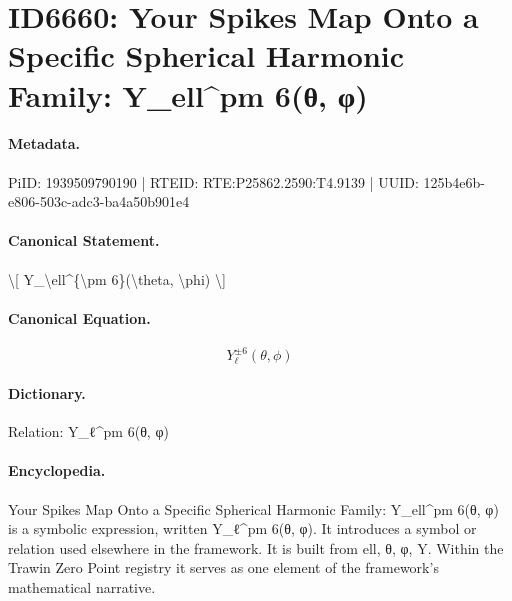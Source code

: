 \section*{ID6660: Your Spikes Map Onto a Specific Spherical Harmonic Family: Y\_ell\textasciicircum{}pm 6(θ, φ)}
\paragraph{Metadata.}
PiID: 1939509790190 | RTEID: RTE:P25862.2590:T4.9139 | UUID: 125b4e6b-e806-503c-adc3-ba4a50b901e4

\paragraph{Canonical Statement.}
\textbackslash{}[ Y\_\textbackslash{}ell\textasciicircum{}\{\textbackslash{}pm 6\}(\textbackslash{}theta, \textbackslash{}phi) \textbackslash{}]

\paragraph{Canonical Equation.}
\[
Y_\ell^{\pm 6}(\theta, \phi)
\]

\paragraph{Dictionary.}
Relation: Y\_ℓ\textasciicircum{}pm 6(θ, φ)

\paragraph{Encyclopedia.}
Your Spikes Map Onto a Specific Spherical Harmonic Family: Y\_ell\textasciicircum{}pm 6(θ, φ) is a symbolic expression, written Y\_ℓ\textasciicircum{}pm 6(θ, φ). It introduces a symbol or relation used elsewhere in the framework. It is built from ell, θ, φ, Y. Within the Trawin Zero Point registry it serves as one element of the framework's mathematical narrative.
